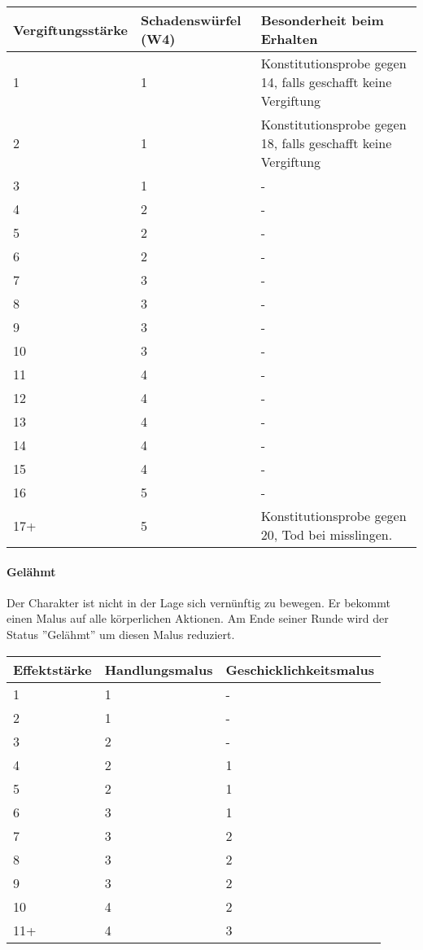 \documentclass{article}
\begin{document}
\begin{small}
\begin{tabular}{|m{3cm}|m{4cm}|m{5cm}|}
\hline
\textbf{Vergiftungsstärke}&\textbf{Schadenswürfel (W4)}&\textbf{Besonderheit beim Erhalten}\\
\hline
\hline
1&1&Konstitutionsprobe gegen 14, falls geschafft keine Vergiftung\\
\hline
2&1&Konstitutionsprobe gegen 18, falls geschafft keine Vergiftung\\
\hline
3&1&-\\
\hline
4&2&-\\
\hline
5&2&-\\
\hline
6&2&-\\
\hline
7&3&-\\
\hline
8&3&-\\
\hline
9&3&-\\
\hline
10&3&-\\
\hline
11&4&-\\
\hline
12&4&-\\
\hline
13&4&-\\
\hline
14&4&-\\
\hline
15&4&-\\
\hline
16&5&-\\
\hline
17+&5&Konstitutionsprobe gegen 20, Tod bei misslingen.\\
\hline
\end{tabular}
\end{small}

\paragraph{Gelähmt}

Der Charakter ist nicht in der Lage sich vernünftig zu bewegen. Er bekommt einen Malus auf alle körperlichen Aktionen.
Am Ende seiner Runde wird der Status ''Gelähmt'' um diesen Malus reduziert.


\begin{small}
\begin{tabular}{|m{2cm}|m{3cm}|m{6cm}|}
\hline
\textbf{Effektstärke}&\textbf{Handlungsmalus}&\textbf{Geschicklichkeitsmalus}\\
\hline
\hline
1&1&-\\
\hline
2&1&-\\
\hline
3&2&-\\
\hline
4&2&1\\
\hline
5&2&1\\
\hline
6&3&1\\
\hline
7&3&2\\
\hline
8&3&2\\
\hline
9&3&2\\
\hline
10&4&2\\
\hline
11+&4&3\\
\hline
\end{tabular}
\end{small}
\end{document}
